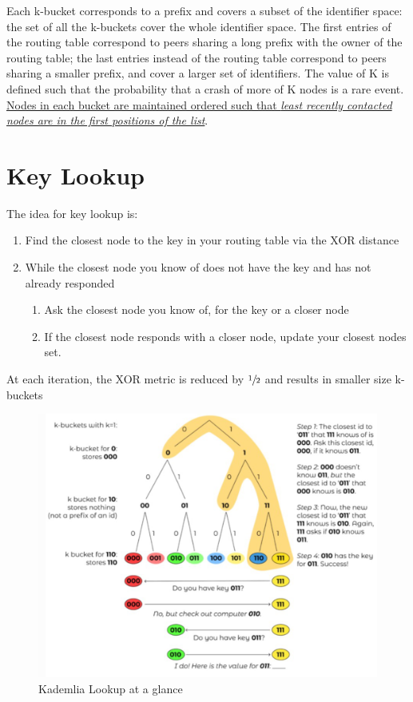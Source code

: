 Each k-bucket corresponds to a prefix and covers a subset of the identifier space: the set of all the k-buckets cover the whole identifier space.
The first entries of the routing table correspond to peers sharing a long prefix
with the owner of the routing table; the last entries instead of the routing table correspond to peers sharing a smaller prefix, and cover a larger set of identifiers.
The value of K is defined such that the probability that a crash of more of K
nodes is a rare event.
\ul{Nodes in each bucket are maintained ordered such that \textit{least recently contacted nodes are in the first positions of the list}}.

\section{Key Lookup}

The idea for key lookup is:
\begin{enumerate}
   \item Find the closest node to the key in your routing table via the XOR distance
   \item While the closest node you know of does not have the key and has not already responded
   \begin{enumerate}
      \item Ask the closest node you know of, for the key or a closer node
      \item If the closest node responds with a closer node, update your closest nodes set.
   \end{enumerate}
\end{enumerate}
At each iteration, the XOR metric is reduced by $\sfrac{1}{2}$ and results in smaller size k-buckets

\begin{figure}[htbp]
   \centering
   \includegraphics{images/kademlia_lookup.png}
   \caption{Kademlia Lookup at a glance}
   \label{fig:kademlia_lookup}
\end{figure}

